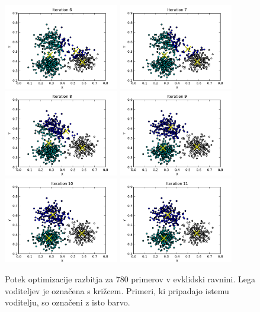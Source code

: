 \begin{figure}[htbp]
\begin{center}
\includegraphics[width=5cm]{slike/kmeans-scatter-006.pdf}
\includegraphics[width=5cm]{slike/kmeans-scatter-007.pdf}
\includegraphics[width=5cm]{slike/kmeans-scatter-008.pdf}
\includegraphics[width=5cm]{slike/kmeans-scatter-009.pdf}
\includegraphics[width=5cm]{slike/kmeans-scatter-010.pdf}
\includegraphics[width=5cm]{slike/kmeans-scatter-011.pdf}
\caption{Potek optimizacije razbitja za 780 primerov v evklidski
  ravnini. Lega voditeljev je označena s križcem. Primeri, ki
  pripadajo istemu voditelju, so označeni z isto barvo.}
\label{f-kmeans-trace}
\end{center}
\end{figure}

